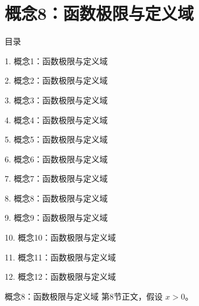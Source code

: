 \documentclass[aspectratio=169,10pt,fontset=fandol]{ctexbeamer}
\begin{document}
\section{概念8：函数极限与定义域}
\begin{frame}[t,fragile]{目录}
\small
{\color{black}\small 1. 概念1：函数极限与定义域\par}\vspace{0.22em}
{\color{black}\small 2. 概念2：函数极限与定义域\par}\vspace{0.22em}
{\color{black}\small 3. 概念3：函数极限与定义域\par}\vspace{0.22em}
{\color{black}\small 4. 概念4：函数极限与定义域\par}\vspace{0.22em}
{\color{black}\small 5. 概念5：函数极限与定义域\par}\vspace{0.22em}
{\color{black}\small 6. 概念6：函数极限与定义域\par}\vspace{0.22em}
{\color{black}\small 7. 概念7：函数极限与定义域\par}\vspace{0.22em}
{\color{blue}\small 8. 概念8：函数极限与定义域\par}\vspace{0.22em}
{\color{gray!40}\small 9. 概念9：函数极限与定义域\par}\vspace{0.22em}
{\color{gray!40}\small 10. 概念10：函数极限与定义域\par}\vspace{0.22em}
{\color{gray!40}\small 11. 概念11：函数极限与定义域\par}\vspace{0.22em}
{\color{gray!40}\small 12. 概念12：函数极限与定义域\par}\vspace{0.22em}
\end{frame}
\begin{frame}[t,fragile]{概念8：函数极限与定义域}
\normalsize
{\normalsize
第8节正文，假设 $x>0$。
}
\end{frame}
\end{document}
